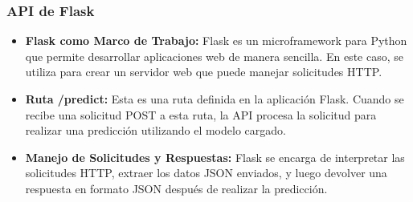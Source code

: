\subsubsection{API de Flask}

\begin{itemize}
    \item \textbf{Flask como Marco de Trabajo:} Flask es un microframework para Python que permite desarrollar aplicaciones web de manera sencilla. En este caso, se utiliza para crear un servidor web que puede manejar solicitudes HTTP.
    \item \textbf{Ruta /predict:} Esta es una ruta definida en la aplicación Flask. Cuando se recibe una solicitud POST a esta ruta, la API procesa la solicitud para realizar una predicción utilizando el modelo cargado.
    \item \textbf{Manejo de Solicitudes y Respuestas:} Flask se encarga de interpretar las solicitudes HTTP, extraer los datos JSON enviados, y luego devolver una respuesta en formato JSON después de realizar la predicción.
\end{itemize}